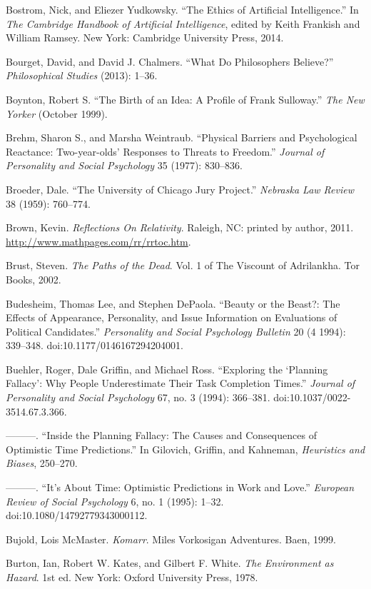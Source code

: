 \documentclass[letterpaper]{book}
\begin{document}
{
 Bostrom, Nick, and Eliezer Yudkowsky. ``The
Ethics of Artificial Intelligence.'' In \textit{The
Cambridge Handbook of Artificial Intelligence}, edited by Keith
Frankish and William Ramsey. New York: Cambridge University Press,
2014.}

{
 Bourget, David, and David J. Chalmers. ``What Do
Philosophers Believe?'' \textit{Philosophical
Studies} (2013): 1--36.}

{
 Boynton, Robert S. ``The Birth of an Idea: A
Profile of Frank Sulloway.'' \textit{The New Yorker}
(October 1999).}

{
 Brehm, Sharon S., and Marsha Weintraub.
``Physical Barriers and Psychological Reactance:
Two-year-olds' Responses to Threats to
Freedom.'' \textit{Journal of Personality and Social
Psychology} 35 (1977): 830--836.}

{
 Broeder, Dale. ``The University of Chicago Jury
Project.'' \textit{Nebraska Law Review} 38 (1959):
760--774.}

{
 Brown, Kevin. \textit{Reflections On Relativity}. Raleigh, NC:
printed by author, 2011. \url{http://www.mathpages.com/rr/rrtoc.htm}.}

{
 Brust, Steven. \textit{The Paths of the Dead}. Vol. 1 of The
Viscount of Adrilankha. Tor Books, 2002.}

{
 Budesheim, Thomas Lee, and Stephen DePaola.
``Beauty or the Beast?: The Effects of Appearance,
Personality, and Issue Information on Evaluations of Political
Candidates.'' \textit{Personality and Social
Psychology Bulletin} 20 (4 1994): 339--348.
doi:10.1177/0146167294204001.}

{
 Buehler, Roger, Dale Griffin, and Michael Ross.
``Exploring the `Planning
Fallacy': Why People Underestimate Their Task
Completion Times.'' \textit{Journal of Personality
and Social Psychology} 67, no. 3 (1994): 366--381.
doi:10.1037/0022-3514.67.3.366.}

{
 {}---{}---{}---. ``Inside the Planning Fallacy:
The Causes and Consequences of Optimistic Time
Predictions.'' In Gilovich, Griffin, and Kahneman,
\textit{Heuristics and Biases}, 250--270.}

{
 {}---{}---{}---. ``It's About
Time: Optimistic Predictions in Work and Love.''
\textit{European Review of Social Psychology} 6, no. 1 (1995): 1--32.
doi:10.1080/14792779343000112.}

{
 Bujold, Lois McMaster. \textit{Komarr}. Miles Vorkosigan
Adventures. Baen, 1999.}

{
 Burton, Ian, Robert W. Kates, and Gilbert F. White. \textit{The
Environment as Hazard}. 1st ed. New York: Oxford University Press,
1978.}
\end{document}
